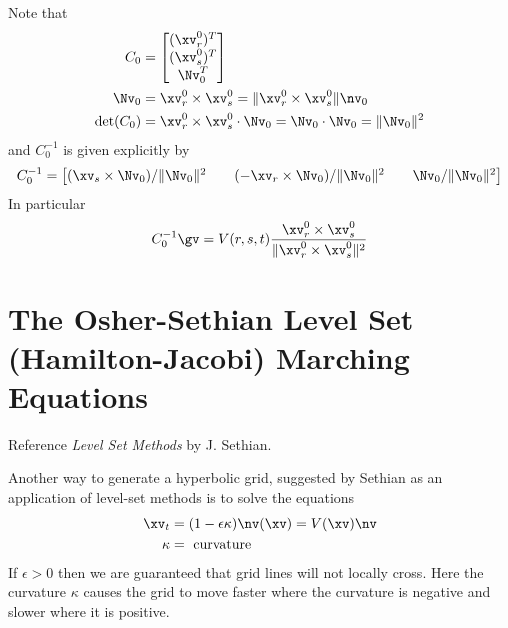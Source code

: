Note that
\begin{align*}
C_0 & = \begin{bmatrix} (\xv_r^0)^T \\ (\xv_s^0)^T \\ \Nv_0^T \end{bmatrix}  \\
\Nv_0 &= \xv_r^0 \times \xv_s^0 = \|\xv_r^0 \times \xv_s^0\| \nv_0 \\
\mbox{det}( C_0 ) &= \xv_r^0\times \xv_s^0 \cdot \Nv_0 = \Nv_0 \cdot \Nv_0 = \| \Nv_0 \|^2
\end{align*}  
and $C_0^{-1}$ is given explicitly by
\[
  C_0^{-1} = 
     \begin{bmatrix} {(\xv_s \times \Nv_0 )/ \|\Nv_0\|^2} &&
                     {(-\xv_r \times \Nv_0)/ \|\Nv_0\|^2  }&& 
                     {\Nv_0 / \|\Nv_0\|^2 } \end{bmatrix} 
\]
In particular
\[
C_0^{-1}\gv = V(r,s,t) {\xv_r^0 \times \xv_s^0  \over \|\xv_r^0 \times \xv_s^0 \|^2}
\]



\section{The Osher-Sethian Level Set (Hamilton-Jacobi) Marching Equations}

Reference {\sl Level Set Methods} by J. Sethian\cite{Sethian96}.

Another way to generate a hyperbolic grid, suggested by Sethian as an application
of level-set methods is to solve the equations
\begin{align*}
    \xv_t &= (1-\epsilon \kappa) \nv(\xv) = V(\xv) \nv \\
    \kappa &= \mbox{ curvature}
\end{align*}
If $\epsilon>0$ then we are guaranteed that grid lines will not locally cross.
Here the curvature $\kappa$ causes the grid to move faster where the curvature is negative
and slower where it is positive.

